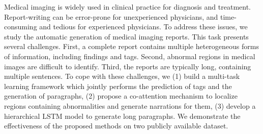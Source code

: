 Medical imaging is widely used in clinical practice for diagnosis and treatment. Report-writing can be error-prone for unexperienced physicians, and time-consuming and tedious for experienced physicians. To address these issues, we study the automatic generation of medical imaging reports. This task presents several challenges. First, a complete report contains multiple heterogeneous forms of information, including findings and tags. Second, abnormal regions in medical images are difficult to identify. Third, the reports are typically long, containing multiple sentences. To cope with these challenges, we (1) build a multi-task learning framework which jointly performs the prediction of tags and the generation of paragraphs, (2) propose a co-attention mechanism to localize regions containing abnormalities and generate narrations for them, (3) develop a hierarchical LSTM model to generate long paragraphs. We demonstrate the effectiveness of the proposed methods on two publicly available dataset.
